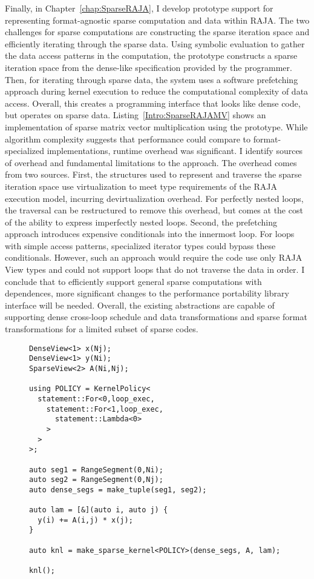 Finally, in Chapter~\ref{chap:SparseRAJA}, I develop prototype support for representing format-agnostic sparse computation and data within RAJA\@.
The two challenges for sparse computations are constructing the sparse iteration space and efficiently iterating through the sparse data.
Using symbolic evaluation to gather the data access patterns in the computation, the prototype constructs a sparse iteration space from the dense-like specification provided by the programmer.
Then, for iterating through sparse data, the system uses a software prefetching approach during kernel execution to reduce the computational complexity of data access.
Overall, this creates a programming interface that looks like dense code, but operates on sparse data.
Listing~\ref{Intro:SparseRAJAMV} shows an implementation of sparse matrix vector multiplication using the prototype.
While algorithm complexity suggests that performance could compare to format-specialized implementations, runtime overhead was significant.
I identify sources of overhead and fundamental limitations to the approach.
The overhead comes from two sources.
First, the structures used to represent and traverse the sparse iteration space use virtualization to meet type requirements of the RAJA execution model, incurring devirtualization overhead.
For perfectly nested loops, the traversal can be restructured to remove this overhead, but comes at the cost of the ability to express imperfectly nested loops.
Second, the prefetching approach introduces expensive conditionals into the innermost loop.
For loops with simple access patterns, specialized iterator types could bypass these conditionals.
However, such an approach would require the code use only RAJA View types and could not support loops that do not traverse the data in order.
I conclude that to efficiently support general sparse computations with dependences, more significant changes to the performance portability library interface will be needed.
Overall, the existing abstractions are capable of supporting dense cross-loop schedule and data transformations and sparse format transformations for a limited subset of sparse codes.

\begin{figure}
\begin{lstlisting}[caption={Implementation of SpMV using the SparseRAJA prototype},label=Intro:SparseRAJAMV]
DenseView<1> x(Nj);
DenseView<1> y(Ni);
SparseView<2> A(Ni,Nj);

using POLICY = KernelPolicy<
  statement::For<0,loop_exec,
    statement::For<1,loop_exec,
      statement::Lambda<0>
    >
  >
>;

auto seg1 = RangeSegment(0,Ni);
auto seg2 = RangeSegment(0,Nj);
auto dense_segs = make_tuple(seg1, seg2);

auto lam = [&](auto i, auto j) {
  y(i) += A(i,j) * x(j);
}

auto knl = make_sparse_kernel<POLICY>(dense_segs, A, lam);
  
knl();
\end{lstlisting}
\end{figure}